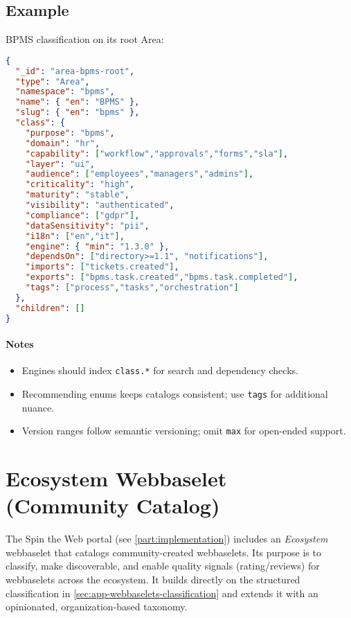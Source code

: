 \subsection{Example}
BPMS classification on its root Area:
\begin{lstlisting}[language=JSON,caption={STWArea with classification}]
{
  "_id": "area-bpms-root",
  "type": "Area",
  "namespace": "bpms",
  "name": { "en": "BPMS" },
  "slug": { "en": "bpms" },
  "class": {
    "purpose": "bpms",
    "domain": "hr",
    "capability": ["workflow","approvals","forms","sla"],
    "layer": "ui",
    "audience": ["employees","managers","admins"],
    "criticality": "high",
    "maturity": "stable",
    "visibility": "authenticated",
    "compliance": ["gdpr"],
    "dataSensitivity": "pii",
    "i18n": ["en","it"],
    "engine": { "min": "1.3.0" },
    "dependsOn": ["directory>=1.1", "notifications"],
    "imports": ["tickets.created"],
    "exports": ["bpms.task.created","bpms.task.completed"],
    "tags": ["process","tasks","orchestration"]
  },
  "children": []
}
\end{lstlisting}

\paragraph{Notes}
\begin{itemize}
  \item Engines should index \texttt{class.*} for search and dependency checks.
  \item Recommending enums keeps catalogs consistent; use \texttt{tags} for additional nuance.
  \item Version ranges follow semantic versioning; omit \texttt{max} for open-ended support.
\end{itemize}

\section{Ecosystem Webbaselet (Community Catalog)}
\label{sec:app-ecosystem}

The Spin the Web portal (see \cref{part:implementation}) includes an \emph{Ecosystem} webbaselet that catalogs community-created webbaselets. Its purpose is to classify, make discoverable, and enable quality signals (rating/reviews) for webbaselets across the ecosystem. It builds directly on the structured classification in \cref{sec:app-webbaselets-classification} and extends it with an opinionated, organization-based taxonomy.

